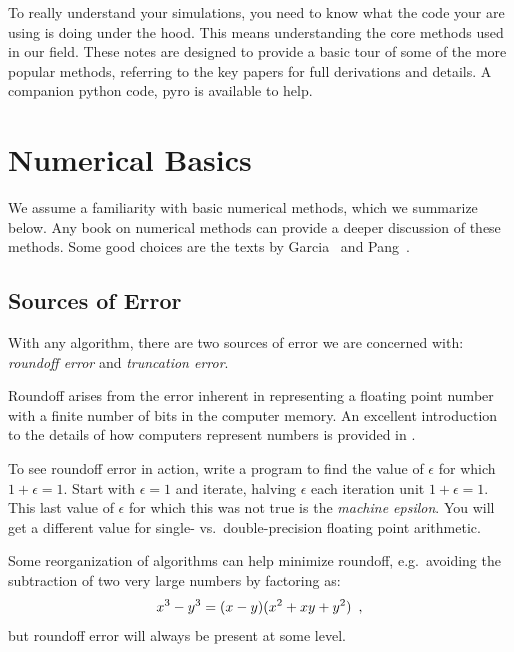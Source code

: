 To really understand your simulations, you need to know what the code
your are using is doing under the hood.  This means understanding the 
core methods used in our field.  These notes are designed to provide
a basic tour of some of the more popular methods, referring to the 
key papers for full derivations and details.  A companion python code,
{\sf pyro} is available to help. 


\section{Numerical Basics}

We assume a familiarity with basic numerical methods, which we
summarize below.  Any book on numerical methods can provide a
deeper discussion of these methods.  Some good choices are the
texts by Garcia~\cite{garcia} and Pang~\cite{pang}.

\subsection{Sources of Error}

With any algorithm, there are two sources of error we are concerned
with: {\em roundoff error} and {\em truncation error}.  

Roundoff arises from the error inherent in representing a floating
point number with a finite number of bits in the computer memory.  An
excellent introduction to the details of how computers represent
numbers is provided in \cite{goldberg:1991}.  

\begin{exercise}
To see roundoff error in action, write a program to find the value of
$\epsilon$ for which $1 + \epsilon = 1$.  Start with $\epsilon = 1$
and iterate, halving $\epsilon$ each iteration unit $1 + \epsilon =
1$. This last value of $\epsilon$ for which this was not true is
the {\em machine epsilon}.  You will get a different value for
single- vs.\ double-precision floating point arithmetic.
\end{exercise}

Some reorganization of algorithms can help minimize roundoff,
e.g.\ avoiding the subtraction of two very large numbers by factoring as:
\begin{equation}
x^3 - y^3 = (x - y)(x^2 + xy + y^2) \enskip ,
\end{equation}
but roundoff error will always be present at some level.

